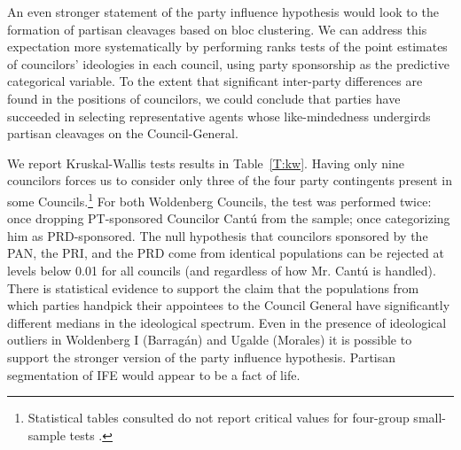 \documentclass[12 pt, letter]{article}
\begin{document}
An even stronger statement of the party influence hypothesis would look to the formation of partisan cleavages based on bloc clustering.  We can address this expectation more systematically by performing ranks tests of the point estimates of councilors' ideologies in each council, using party sponsorship as the predictive categorical variable.  To the extent that significant inter-party differences are found in the positions of councilors, we could conclude that parties have succeeded in selecting representative agents whose like-mindedness undergirds partisan cleavages on the Council-General.

We report Kruskal-Wallis tests results in Table~\ref{T:kw}. Having only nine councilors forces us to consider only three of the four party contingents present in some Councils.\footnote{Statistical tables consulted do not report critical values for four-group small-sample tests \citep[][pp. 555-6]{Daniel1990}.} For both Woldenberg Councils, the test was performed twice: once dropping PT-sponsored Councilor Cant\'u from the sample; once categorizing him as PRD-sponsored. The null hypothesis that councilors sponsored by the PAN, the PRI, and the PRD come from identical populations can be rejected at levels below 0.01 for all councils (and regardless of how Mr. Cant\'u is handled). There is statistical evidence to support the claim that the populations from which parties handpick their appointees to the Council General have significantly different medians in the ideological spectrum. Even in the presence of ideological outliers in Woldenberg I (Barrag\'an) and Ugalde (Morales) it is possible to support the stronger version of the party influence hypothesis. Partisan segmentation of IFE would appear to be a fact of life.
\end{document}
